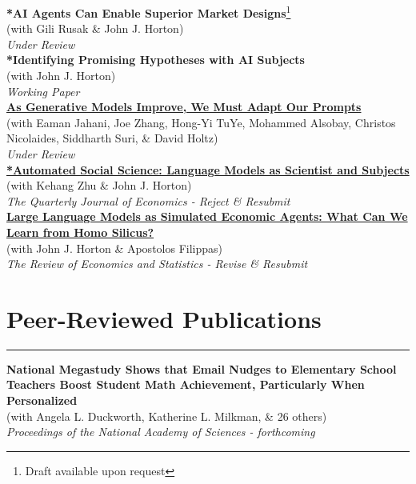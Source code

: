 \documentclass[11.25pt]{article}
\begin{document}
\noindent\textbf{*AI Agents Can Enable Superior Market Designs}\footnote{Draft available upon request}\\ 
(with Gili Rusak \& John J. Horton)\\
\textit{Under Review}\\

\noindent\textbf{*Identifying Promising Hypotheses with AI Subjects}\footnotemark[\value{footnote}]\\ 
(with John J. Horton)\\
\textit{Working Paper}\\

\noindent\textbf{\href{https://arxiv.org/abs/2407.14333}{As Generative Models Improve, We Must Adapt Our Prompts}} \\ (with Eaman Jahani, Joe Zhang, Hong-Yi TuYe, Mohammed Alsobay, Christos Nicolaides, Siddharth
Suri, \& David Holtz)\\
\textit{Under Review}\\

\noindent\textbf{\href{https://www.nber.org/papers/w32381}{*Automated Social Science: Language Models as Scientist and Subjects}}\\ 
(with Kehang Zhu \& John J. Horton)\\
\textit{The Quarterly Journal of Economics - Reject \& Resubmit}\\

\noindent\href{https://www.nber.org/papers/w31122}{\textbf{Large Language Models as Simulated Economic Agents: What Can We Learn from Homo Silicus?}} \\ (with John J. Horton \& Apostolos Filippas) \\
\textit{The Review of Economics and Statistics - Revise \& Resubmit}\\

\section*{Peer-Reviewed Publications} \vspace{-1mm} \hrule
\vspace{3mm}

\noindent \textbf{National Megastudy Shows that Email Nudges to Elementary School Teachers Boost Student Math Achievement, Particularly When Personalized} \\
(with Angela L. Duckworth, Katherine L. Milkman, \& 26 others) \\
\textit{Proceedings of the National Academy of Sciences - forthcoming}\\
\end{document}
